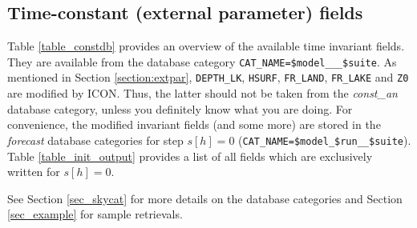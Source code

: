 \subsection{Time-constant (external parameter) fields}

Table \ref{table_constdb} provides an overview of the available time invariant fields. They are available from the database category 
\texttt{CAT\_NAME=\$model\_\_\_\$suite}. As mentioned in Section \ref{section:extpar}, \texttt{DEPTH\_LK}, 
\texttt{HSURF}, \texttt{FR\_LAND}, \texttt{FR\_LAKE} and \texttt{Z0} are modified by ICON. Thus, the latter should not be taken from 
the \emph{const\_an} database category, unless you definitely know what you are doing. For convenience, the modified invariant fields 
(and some more) are stored in the \emph{forecast} database categories for step $s[h]=0$ 
(\texttt{CAT\_NAME=\$model\_\$run\_\_\$suite}). Table \ref{table_init_output} provides a list of all fields which are exclusively 
written for $s[h]=0$.

See Section \ref{sec_skycat} for more details on the database categories and Section \ref{sec_example} for sample retrievals.
 


